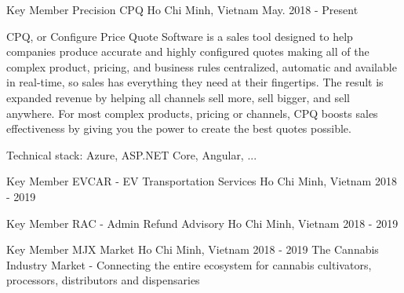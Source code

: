 

\begin{cventries}

  \cventry
    {Key Member} %
    {Precision CPQ} %
    {Ho Chi Minh, Vietnam} %
    {May. 2018 - Present} %
    {
      \begin{cvitems} %
        \item {CPQ, or Configure Price Quote Software is a sales tool designed to help companies produce accurate and highly configured quotes making all of the complex product, pricing, and business rules centralized, automatic and available in real-time, so sales has everything they need at their fingertips. The result is expanded revenue by helping all channels sell more, sell bigger, and sell anywhere. For most complex products, pricing or channels, CPQ boosts sales effectiveness by giving you the power to create the best quotes possible.}
        \item {Technical stack: Azure, ASP.NET Core, Angular, ...}
      \end{cvitems}
    }

  \cventry
    {Key Member} %
    {EVCAR - EV Transportation Services} %
    {Ho Chi Minh, Vietnam} %
    {2018 - 2019} %
    {}

  \cventry
    {Key Member} %
    {RAC - Admin Refund Advisory} %
    {Ho Chi Minh, Vietnam} %
    {2018 - 2019} %
    {}

  \cventry
    {Key Member} %
    {MJX Market} %
    {Ho Chi Minh, Vietnam} %
    {2018 - 2019} %
    {The Cannabis Industry Market - Connecting the entire ecosystem for cannabis cultivators, processors, distributors and dispensaries}


\end{cventries}
